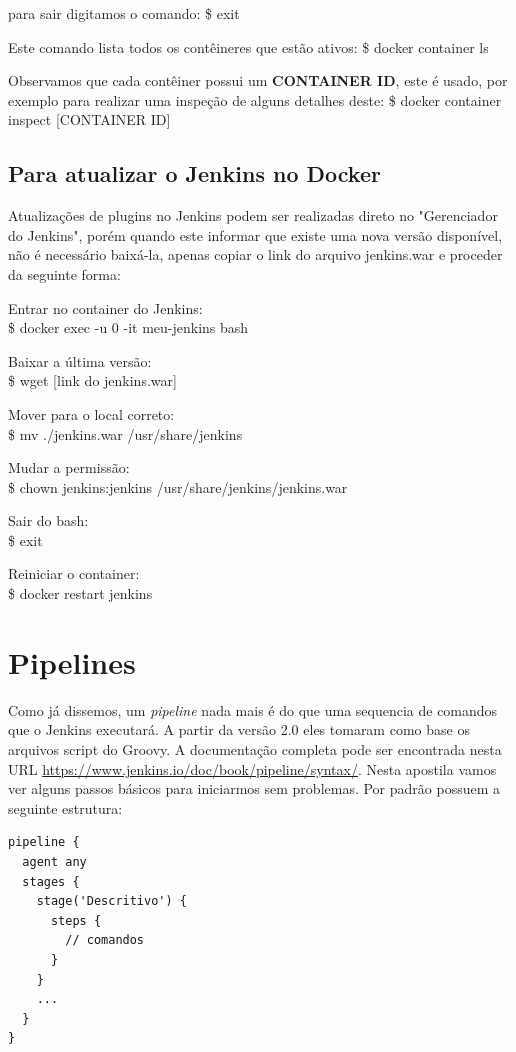 \documentclass[a4paper,11pt]{article}
\begin{document}
para sair digitamos o comando:
{\ttfamily\$ exit}

Este comando lista todos os contêineres que estão ativos:
{\ttfamily\$ docker container ls}

Observamos que cada contêiner possui um \textbf{CONTAINER ID}, este é usado, por exemplo para realizar uma inspeção de alguns detalhes deste:
{\ttfamily\$ docker container inspect [CONTAINER ID]}

\subsection{Para atualizar o Jenkins no Docker}
Atualizações de plugins no Jenkins podem ser realizadas direto no "Gerenciador do Jenkins", porém quando este informar que existe uma nova versão disponível, não é necessário baixá-la, apenas copiar o link do arquivo jenkins.war e proceder da seguinte forma:

Entrar no container do Jenkins: \\
{\ttfamily\$ docker exec -u 0 -it meu-jenkins bash}

Baixar a última versão: \\
{\ttfamily\$ wget [link do jenkins.war]}

Mover para o local correto: \\
{\ttfamily\$ mv ./jenkins.war /usr/share/jenkins}

Mudar a permissão: \\
{\ttfamily\$ chown jenkins:jenkins /usr/share/jenkins/jenkins.war}

Sair do bash: \\
{\ttfamily\$ exit}

Reiniciar o container: \\
{\ttfamily\$ docker restart jenkins}

\section{Pipelines}
Como já dissemos, um \textit{pipeline} nada mais é do que uma sequencia de comandos que o Jenkins executará. A partir da versão 2.0 eles tomaram como base os arquivos script do Groovy.
A documentação completa pode ser encontrada nesta URL \url{https://www.jenkins.io/doc/book/pipeline/syntax/}. Nesta apostila vamos ver alguns passos básicos para iniciarmos sem problemas. Por padrão possuem a seguinte estrutura:
\begin{lstlisting}
pipeline {
  agent any
  stages {
    stage('Descritivo') {
      steps {
        // comandos
      }
    }
    ...
  }
}
\end{lstlisting}
\end{document}
